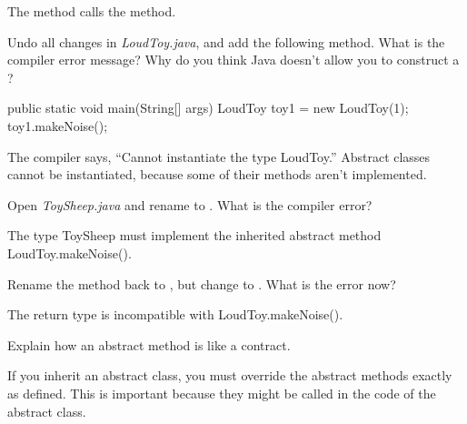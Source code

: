 \begin{answer}[3em]
The  method calls the  method.
\end{answer}


\Q Undo all changes in \textit{LoudToy.java}, and add the following  method.
What is the compiler error message?
Why do you think Java doesn't allow you to construct a ?

\begin{javalst}
public static void main(String[] args) {
    LoudToy toy1 = new LoudToy(1);
    toy1.makeNoise();
}
\end{javalst}

\begin{answer}
The compiler says, ``Cannot instantiate the type LoudToy.''
Abstract classes cannot be instantiated, because some of their methods aren't implemented.
\end{answer}


\Q Open \textit{ToySheep.java} and rename  to .
What is the compiler error?

\begin{answer}[3em]
The type ToySheep must implement the inherited abstract method LoudToy.makeNoise().
\end{answer}


\Q Rename the method back to , but change  to .
What is the error now?

\begin{answer}[3em]
The return type is incompatible with LoudToy.makeNoise().
\end{answer}


\Q \label{key2}
Explain how an abstract method is like a contract.

\begin{answer}[5em]
If you inherit an abstract class, you must override the abstract methods exactly as defined.
This is important because they might be called in the code of the abstract class.
\end{answer}

